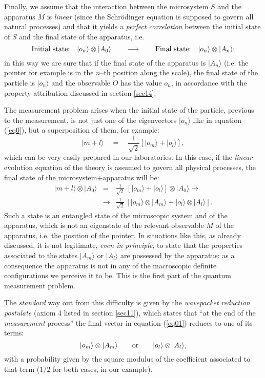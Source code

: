 \documentclass[12pt]{article}
\begin{document}
Finally, we assume that the interaction between the microsystem
$S$ and the apparatus $M$ is {\it linear} (since the Schr\"odinger
equation is supposed to govern all natural processes) and that it
yields a {\it perfect  correlation} between the initial state of
$S$ and the final state of  the apparatus, i.e.
\begin{equation} \label{eq0}
\makebox{Initial state:
$\;\;|o_{n}\rangle\otimes|A_{0}\rangle$}\qquad
\longrightarrow\qquad \makebox{Final state:
$\;\;|o_{n}\rangle\otimes|A_{n}\rangle$};
\end{equation}
in this way we are sure that if the final state of the apparatus
is $|A_{n}\rangle$ (i.e. the pointer for example is in the $n$--th
position along the scale), the final state of the particle is
$|o_{n}\rangle$ and the observable $O$ has the value $o_{n}$, in
accordance with the property attribution discussed in section
\ref{sec14}.

The measurement problem arises when the initial state of the
particle, previous to the measurement, is not just one of the
eigenvectors $|o_{n}\rangle$ like in equation (\ref{eq0}), but a
superposition of them, for example:
\[
|m + l\rangle\quad =\quad \frac{1}{\sqrt{2}}[ |o_{m}\rangle +
|o_{l}\rangle],
\]
which can be very easily prepared in our laboratories. In this
case, if the {\it linear} evolution equation of the theory is
assumed to govern all physical processes, the final state of the
microsystem+apparatus will be:
\begin{eqnarray} \label{eq01}
|m + l\rangle\otimes|A_{0}\rangle & = & \frac{1}{\sqrt{2}}\;[
|o_{m}\rangle + |o_{l}\rangle]\otimes|A_{0}\rangle \longrightarrow
\nonumber \\
& \longrightarrow & \frac{1}{\sqrt{2}}\,[|o_{m}\rangle\otimes
|A_{m}\rangle + |o_{l}\rangle\otimes|A_{l}\rangle ].
\end{eqnarray}
Such a state is an entangled state of the microscopic system and
of the apparatus, which is not an eigenstate of the relevant
observable  $M$ of the apparatus, i.e. the position of the pointer.
In situations like this, as already discussed, it is not
legitimate, {\it even in principle}, to state that the properties
associated to the states $|A_{m}\rangle$  or $|A_{l}\rangle$ are
possessed by the apparatus: as a consequence the apparatus is not
in any of the macroscopic definite configurations we perceive it
to be. This is the first part of the quantum measurement problem.

The {\it standard} way out from this difficulty is given by the
{\it wavepacket reduction postulate} (axiom 4 listed in section
\ref{sec11}), which states that ``at the end of the {\it
measurement} process'' the final vector in equation (\ref{eq01})
reduces to one of its terms:
\[
|o_{m}\rangle\otimes|A_{m}\rangle \qquad \makebox{or} \qquad
|o_{l}\rangle\otimes|A_{l}\rangle,
\]
with a probability given by the square modulus of the coefficient
associated to that term ($1/2$ for both cases, in our example).
\end{document}
